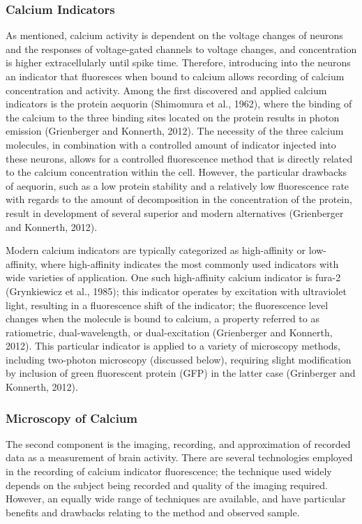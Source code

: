 \documentclass{article}
\begin{document}
\subsubsection{Calcium Indicators}
As mentioned, calcium activity is dependent on the voltage changes of neurons and the responses of voltage-gated channels to voltage changes, and concentration is higher extracellularly until spike time. Therefore, introducing into the neurons an indicator that fluoresces when bound to calcium allows recording of calcium concentration and activity. Among the first discovered and applied calcium indicators is the protein aequorin (Shimomura et al., 1962), where the binding of the calcium to the three binding sites located on the protein results in photon emission (Grienberger and Konnerth, 2012). The necessity of the three calcium molecules, in combination with a controlled amount of indicator injected into these neurons, allows for a controlled fluorescence method that is directly related to the calcium concentration within the cell. However, the particular drawbacks of aequorin, such as a low protein stability and a relatively low fluorescence rate with regards to the amount of decomposition in the concentration of the protein, result in development of several superior and modern alternatives (Grienberger and Konnerth, 2012).\par

Modern calcium indicators are typically categorized as high-affinity or low-affinity, where high-affinity indicates the most commonly used indicators with wide varieties of application. One such high-affinity calcium indicator is fura-2 (Grynkiewicz et al., 1985); this indicator operates by excitation with ultraviolet light, resulting in a fluorescence shift of the indicator; the fluorescence level changes when the molecule is bound to calcium, a property referred to as ratiometric, dual-wavelength, or dual-excitation (Grienberger and Konnerth, 2012). This particular indicator is applied to a variety of microscopy methods, including two-photon microscopy (discussed below), requiring slight modification by inclusion of green fluorescent protein (GFP) in the latter case (Grinberger and Konnerth, 2012). 

\subsubsection{Microscopy of Calcium}
The second component is the imaging, recording, and approximation of recorded data as a measurement of brain activity. There are several technologies employed in the recording of calcium indicator fluorescence; the technique used widely depends on the subject being recorded and quality of the imaging required. However, an equally wide range of techniques are available, and have particular benefits and drawbacks relating to the method and observed sample.\par
\end{document}
